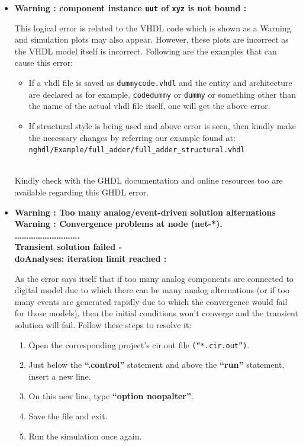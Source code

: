 \begin{itemize}
\item \textbf{Warning : component instance \texttt{uut} of \texttt{xyz}  is not bound  : }

This logical error is related to the VHDL code which is shown as a Warning and simulation plots may also appear. However, these plots are incorrect as the VHDL model itself is incorrect. 
Following are the examples that can cause this error:
\begin{itemize}
\item If a vhdl file is saved as \texttt{dummycode.vhdl} and the entity and architecture 
are declared as for example, \texttt{codedummy} or \texttt{dummy} or something other than the name of the actual vhdl file itself, one will get the above error.
\item If structural style is being used and above error is seen, then kindly make the necessary changes by referring our example found at:\\ \texttt{nghdl/Example/full\_adder/full\_adder\_structural.vhdl}
\end{itemize}\\
Kindly check with the GHDL documentation and online resources too are available regarding this GHDL error.

\item \textbf{Warning : Too many analog/event-driven solution alternations \\
     Warning : Convergence problems at node (net-*). \\         
            ………………………. \\
     Transient solution failed - \\
     doAnalyses: iteration limit reached : } 

As the error says itself that if too many analog components are connected to digital model due to which there can be many analog alternations (or if too many events are generated rapidly due to which the convergence would fail for those models), then the initial conditions won’t converge and the transient solution will fail. Follow these steps to resolve it:
\begin{enumerate}
    \item Open the corresponding project’s cir.out file \texttt{(“*.cir.out”)}.
    \item Just below the \textbf{“.control”} statement and above the \textbf{“run”} statement, insert a new 
     line.
     \item On this new line, type \textbf{“option noopalter”}.
     \item Save the file and exit.
     \item Run the simulation once again.
\end{enumerate}



\end{itemize}

